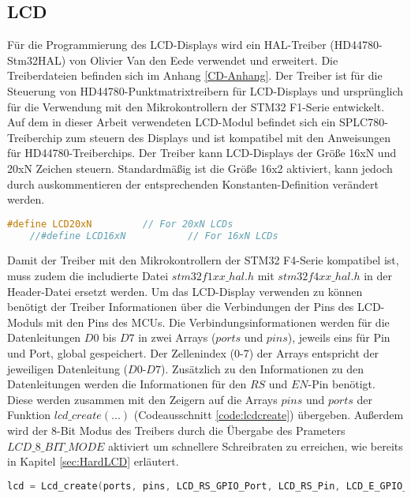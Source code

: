 \subsection{LCD}
Für die Programmierung des LCD-Displays wird ein HAL-Treiber (HD44780-Stm32HAL) von Olivier Van den Eede verwendet und erweitert. Die Treiberdateien befinden sich im Anhang \ref{CD-Anhang}. Der Treiber ist für die Steuerung von HD44780-Punktmatrixtreibern für LCD-Displays und ursprünglich für die Verwendung mit den Mikrokontrollern der STM32 F1-Serie entwickelt. Auf dem in dieser Arbeit verwendeten LCD-Modul befindet sich ein SPLC780-Treiberchip zum steuern des Displays und ist kompatibel mit den Anweisungen für HD44780-Treiberchips. Der Treiber kann LCD-Displays der Größe 16xN und 20xN Zeichen steuern. Standardmäßig ist die Größe 16x2 aktiviert, kann jedoch durch auskommentieren der entsprechenden Konstanten-Definition verändert werden. 
\begin{lstlisting}[firstnumber=16, language=C, caption = lcd.h: Einstellung Displaygröße, label = code:lcdsize]
	#define LCD20xN 		// For 20xN LCDs
	//#define LCD16xN			// For 16xN LCDs
\end{lstlisting}
Damit der Treiber mit den Mikrokontrollern der STM32 F4-Serie kompatibel ist, muss zudem die includierte Datei $stm32f1xx\_hal.h$ mit $stm32f4xx\_hal.h$ in der Header-Datei ersetzt werden.
\newline
Um das LCD-Display verwenden zu können benötigt der Treiber Informationen über die Verbindungen der Pins des LCD-Moduls mit den Pins des MCUs. Die Verbindungsinformationen werden für die Datenleitungen $D0$ bis $D7$ in zwei Arrays ($ports$ und $pins$), jeweils eins für Pin und Port, global gespeichert. Der Zellenindex (0-7) der Arrays entspricht der jeweiligen Datenleitung ($D0$-$D7$). Zusätzlich zu den Informationen zu den Datenleitungen werden die Informationen für den $RS$ und $EN$-Pin benötigt. Diese werden zusammen mit den Zeigern auf die Arrays $pins$ und $ports$ der Funktion $lcd\_create(...)$ (Codeausschnitt \ref{code:lcdcreate}) übergeben. Außerdem wird der 8-Bit Modus des Treibers durch die Übergabe des Prameters $LCD\_8\_BIT\_MODE$ aktiviert um schnellere Schreibraten zu erreichen, wie bereits in Kapitel \ref{sec:HardLCD} erläutert.
\begin{lstlisting}[firstnumber=302, language=C, caption = main.c: Funktionsaufruf lcd\_create(...), label = code:lcdcreate, breaklines = true]
lcd = Lcd_create(ports, pins, LCD_RS_GPIO_Port, LCD_RS_Pin, LCD_E_GPIO_Port, LCD_E_Pin, LCD_8_BIT_MODE);
\end{lstlisting}


